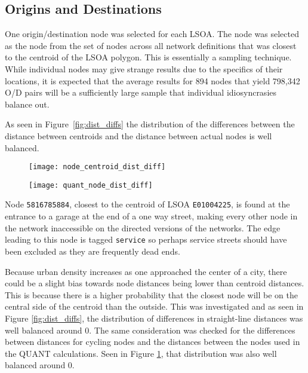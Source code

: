 \subsection{Origins and Destinations}

One origin/destination node was selected for each LSOA. The node was selected as the node from the set of nodes across all network definitions that was closest to the centroid of the LSOA polygon. This is essentially a sampling technique. While individual nodes may give strange results due to the specifics of their locations, it is expected that the average results for 894 nodes that yield 798,342 O/D pairs will be a sufficiently large sample that individual idiosyncrasies balance out. 

As seen in Figure~\ref{fig:dist_diffs} the distribution of the differences between the distance between centroids and the distance between actual nodes is well balanced. 

\begin{figure}
\centering
\begin{minipage}{.5\textwidth}
  \centering
  \texttt{[image: node\_centroid\_dist\_diff]}
  \label{fig:dist_diffs}
\end{minipage}%
\begin{minipage}{.5\textwidth}
  \centering
  \texttt{[image: quant\_node\_dist\_diff]}
  \label{fig:quant_dist_diffs}
\end{minipage}
\end{figure}

Node \texttt{5816785884}, closest to the centroid of LSOA \texttt{E01004225}, is found at the entrance to a garage at the end of a one way street, making every other node in the network inaccessible on the directed versions of the networks. The edge leading to this node is tagged \texttt{service} so perhaps service streets should have been excluded as they are frequently dead ends. 

Because urban density increases as one approached the center of a city, there could be a slight bias towards node distances being lower than centroid distances. This is because there is a higher probability that the closest node will be on the central side of the centroid than the outside. This was investigated and as seen in Figure \ref{fig:dist_diffs}, the distribution of differences in straight-line distances was well balanced around 0. The same consideration was checked for the differences between distances for cycling nodes and the distances between the nodes used in the QUANT calculations. Seen in Figure \ref{fig:quant_dist_diffs}, that distribution was also well balanced around 0. 

